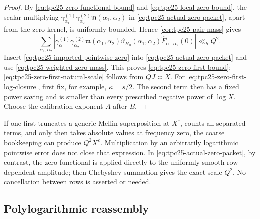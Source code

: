 \begin{proof}
By \eqref{eq:tpc25-zero-functional-bound} and
\eqref{eq:tpc25-local-zero-bound}, the scalar multiplying
\(\gamma^{(1)}_{\alpha_1}\gamma^{(2)}_{\alpha_2}
\mathfrak m(\alpha_1,\alpha_2)\) in
\eqref{eq:tpc25-actual-zero-packet}, apart from the zero kernel, is
uniformly bounded.  Hence \cref{cor:tpc25-pair-mass} gives
\begin{equation}
 \sum_{\alpha_1,\alpha_2}
 \left|
 \gamma^{(1)}_{\alpha_1}\gamma^{(2)}_{\alpha_2}
 \mathfrak m(\alpha_1,\alpha_2)
 \vartheta_{H_0}(\alpha_1,\alpha_2)
 \widehat F_{\alpha_1,\alpha_2}(0)
 \right|
 \ll_h Q^2.
 \label{eq:tpc25-weighted-zero-mass}
\end{equation}
Insert \eqref{eq:tpc25-imported-pointwise-zero} into
\eqref{eq:tpc25-actual-zero-packet} and use
\eqref{eq:tpc25-weighted-zero-mass}.  This proves
\eqref{eq:tpc25-zero-first-bound};
\eqref{eq:tpc25-zero-first-natural-scale} follows from \(QJ\asymp X\).
For \eqref{eq:tpc25-zero-first-log-closure}, first fix, for example,
\(\kappa=s/2\).  The second term then has a fixed power saving and is
smaller than every prescribed negative power of \(\log X\).  Choose
the calibration exponent \(A\) after \(B\).
\end{proof}

\begin{remark}
\label{rem:tpc25-order-of-zero}
If one first truncates a generic Mellin superposition at
\(X^\varepsilon\), counts all separated terms, and only then takes
absolute values at frequency zero, the coarse bookkeeping can produce
\(Q^2X^\varepsilon\).  Multiplication by an arbitrarily logarithmic
pointwise error does not close that expression.  In
\eqref{eq:tpc25-actual-zero-packet}, by contrast, the zero functional
is applied directly to the uniformly smooth row-dependent amplitude;
then Chebyshev summation gives the exact scale \(Q^2\).  No
cancellation between rows is asserted or needed.
\end{remark}

\subsection{Polylogarithmic reassembly}


